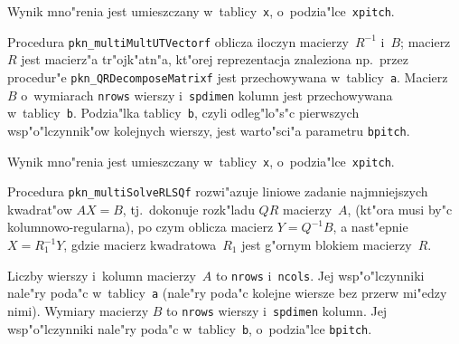 Wynik mno"renia jest umieszczany w~tablicy~\texttt{x},
o~podzia"lce~\texttt{xpitch}.

\vspace{\bigskipamount}
Procedura \texttt{pkn\_multiMultUTVectorf} oblicza iloczyn macierzy~$R^{-1}$
i~$B$; macierz~$R$ jest macierz"a tr"ojk"atn"a, kt"orej reprezentacja
znaleziona np.\ przez procedur"e \texttt{pkn\_QRDecomposeMatrixf} jest
przechowywana w~tablicy~\texttt{a}. Macierz~$B$ o~wymiarach \texttt{nrows}
wierszy
i~\texttt{spdimen} kolumn jest przechowywana w~tablicy~\texttt{b}.
Podzia"lka tablicy~\texttt{b}, czyli odleg"lo"s"c pierwszych
wsp"o"lczynnik"ow kolejnych wierszy, jest warto"sci"a parametru
\texttt{bpitch}.

Wynik mno"renia jest umieszczany w~tablicy~\texttt{x},
o~podzia"lce~\texttt{xpitch}.

\vspace{\bigskipamount}

\vspace{\bigskipamount}
{}
\begin{sloppypar}
Procedura \texttt{pkn\_multiSolveRLSQf} rozwi"azuje liniowe zadanie
najmniejszych kwadrat"ow $AX=B$, tj.\ dokonuje rozk"ladu $QR$ macierzy~$A$,
(kt"ora musi by"c kolumnowo-regularna), po czym oblicza macierz
$Y=Q^{-1}B$, a nast"epnie $X=R_1^{-1}Y$, gdzie macierz kwadratowa~$R_1$ jest
g"ornym blokiem macierzy~$R$.
\end{sloppypar}

Liczby wierszy i~kolumn macierzy~$A$ to \texttt{nrows} i~\texttt{ncols}. Jej
wsp"o"lczynniki nale"ry poda"c w~tablicy~\texttt{a} (nale"ry poda"c kolejne
wiersze bez przerw mi"edzy nimi). Wymiary macierzy $B$ to \texttt{nrows}
wierszy i~\texttt{spdimen} kolumn. Jej wsp"o"lczynniki nale"ry poda"c
w~tablicy~\texttt{b}, o~podzia"lce \texttt{bpitch}.

